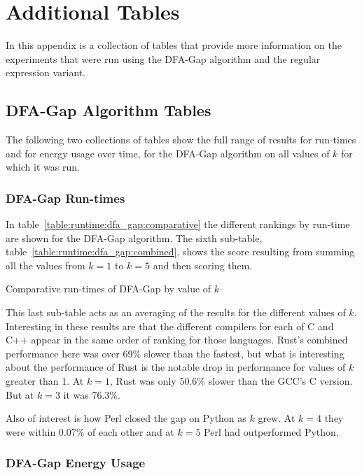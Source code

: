 \section{Additional Tables}
\label{sec:extra_tables}

In this appendix is a collection of tables that provide more information on the experiments that were run using the DFA-Gap algorithm and the regular expression variant.

\subsection{DFA-Gap Algorithm Tables}

The following two collections of tables show the full range of results for run-times and for energy usage over time, for the DFA-Gap algorithm on all values of $k$ for which it was run.

\subsubsection{DFA-Gap Run-times}

In table~\ref{table:runtime:dfa_gap:comparative} the different rankings by run-time are shown for the DFA-Gap algorithm. The sixth sub-table, table~\ref{table:runtime:dfa_gap:combined}, shows the score resulting from summing all the values from $k=1$ to $k=5$ and then scoring them.

\begin{table}[!htb]

\caption{Comparative run-times of DFA-Gap by value of $k$}
\label{table:runtime:dfa_gap:comparative}
\end{table}

This last sub-table acts as an averaging of the results for the different values of $k$. Interesting in these results are that the different compilers for each of C and C++ appear in the same order of ranking for those languages. Rust's combined performance here was over 69\% slower than the fastest, but what is interesting about the performance of Rust is the notable drop in performance for values of $k$ greater than 1. At $k=1$, Rust was only 50.6\% slower than the GCC's C version. But at $k=3$ it was 76.3\%.

Also of interest is how Perl closed the gap on Python as $k$ grew. At $k=4$ they were within 0.07\% of each other and at $k=5$ Perl had outperformed Python.

\subsubsection{DFA-Gap Energy Usage}

